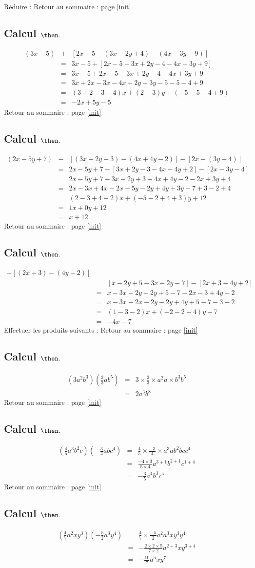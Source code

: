 \documentclass[14pt]{article}
\theoremstyle{remark}
\newcounter{n}
\renewcommand{\it}{Retour au sommaire : page \ref{init}
	\subsection{Calcul $ \mathbf{ \then}.$}\label{\then} \stepcounter{n} }
\theoremstyle{plain}
\begin{document}
Réduire :  
\it \begin{eqnarray*}(3x-5)&+&[2x-5 - (3x-2y+4) - (4x-3y-9)]\\
&=& 3x-5 + [ 2x-5 - 3x+2y-4 - 4x+3y+9]\\
&=& 3x-5 + 2x-5-3x+2y-4-4x+3y+9\\
&=& 3x + 2x - 3x - 4 x + 2y + 3y -5 - 5 - 4 +9 \\
&=& (3+2-3-4)x+(2+3)y+ (-5-5-4+9)\\
&=& -2x +5y -5\end{eqnarray*}
\it \begin{eqnarray*}(2x-5y+7) &-& [(3x+2y-3)-(4x+4y-2)]-[2x-(3y+4)]\\
&=& 2x-5y+7-[3x+2y-3-4x-4y+2] - [2x-3y-4]\\
&=& 2x-5y+7 - 3x-2y+3+4x+4y-2-2x+3y+4\\
&=& 2x-3x+4x-2x-5y-2y+4y+3y+7+3-2+4\\
&=& (2-3+4-2)x+(-5-2+4+3)y+12\\
&=& 1x+0y+12\\
&=& x+12\end{eqnarray*}
\it \begin{eqnarray*}[(x-2y+5) &-& (3x+2y+7)]-[(2x+3)-(4y-2)]\\
&=& [x-2y+5-3x-2y-7]-[2x+3-4y+2]\\
&=& x-3x-2y-2y+5-7 - 2x-3+4y -2\\
&=& x - 3x -2x -2y - 2y +4y +5 - 7 - 3 - 2 \\
&=& (1-3-2)x+(-2-2+4)y -7\\
&=& -4x-7\end{eqnarray*} 
Effectuer les produits suivants :  
\it \begin{eqnarray*}(3a^2b^3)\left(\frac23ab^5\right)&=& 
3\times\frac23\times a^2a\times b^3b^5\\
&=& 2a^3b^8\end{eqnarray*}
\it \begin{eqnarray*}\left(\frac45a^3b^2c\right)\left(-\frac34abc^4\right)&=& \frac45\times\frac{-3}4\times a^3ab^2bcc^4\\
&=& \frac{-4\times3}{5\times4}a^{3+1}b^{2+1}c^{1+4}\\
&=& -\frac35a^4b^3c^5
\end{eqnarray*}
\it \begin{eqnarray*}\left(\frac47a^2xy^3\right)\left(-\frac52a^3y^4\right)
&=& \frac47\times\frac{-5}2a^2a^3xy^3y^4\\
&=& -\frac{2\times2\times5}{7\times2}a^{2+3}xy^{3+4}\\
&=& -\frac{10}7a^5xy^7
\end{eqnarray*}
\end{document}
